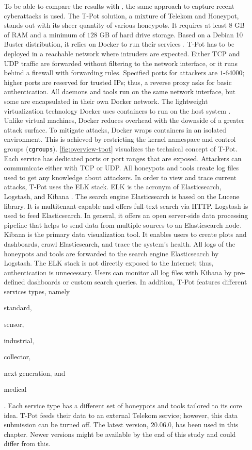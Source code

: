 To be able to compare the results with \citet{Kelly2021}, the same approach to capture recent cyberattacks is used.
The T-Pot solution, a mixture of Telekom and Honeypot, stands out with its sheer quantity of various honeypots.
It requires at least $8$ GB of RAM and a minimum of $128$ GB of hard drive storage.
Based on a Debian 10 Buster distribution, it relies on Docker to run their services \cite{docker2021}.
T-Pot has to be deployed in a reachable network where intruders are expected.
Either TCP and UDP traffic are forwarded without filtering to the network interface, or it runs behind a firewall with forwarding rules.
Specified ports for attackers are $1$-$64000$; higher ports are reserved for trusted IPs; thus, a reverse proxy asks for basic authentication.
All daemons and tools run on the same network interface, but some are encapsulated in their own Docker network.
The lightweight virtualization technology Docker uses containers to run on the host system \cite{combe2016}.
Unlike virtual machines, Docker reduces overhead with the downside of a greater attack surface.
To mitigate attacks, Docker wraps containers in an isolated environment.
This is achieved by restricting the kernel namespace and control groups (\verb|cgroups|).
\autoref{fig:overview-tpot} visualizes the technical concept of T-Pot.
Each service has dedicated ports or port ranges that are exposed.
Attackers can communicate either with TCP or UDP.
All honeypots and tools create log files used to get any knowledge about attackers.
In order to view and trace current attacks, T-Pot uses the ELK stack.
ELK is the acronym of Elasticsearch, Logstash, and Kibana \cite{elastic2021}.
The search engine Elasticsearch is based on the Lucene library.
It is multitenant-capable and offers full-text search via HTTP.
Logstash is used to feed Elasticsearch.
In general, it offers an open server-side data processing pipeline that helps to send data from multiple sources to an Elasticsearch node.
Kibana is the primary data visualization tool.
It enables users to create plots and dashboards, crawl Elasticsearch, and trace the system's health.
All logs of the honeypots and tools are forwarded to the search engine Elasticsearch by Logstash.
The ELK stack is not directly exposed to the Internet; thus, authentication is unnecessary.
Users can monitor all log files with Kibana by pre-defined dashboards or custom search queries.
In addition, T-Pot features different services types, namely
\begin{enumerate*}[label=(\roman*)]
    \item standard,
    \item sensor,
    \item industrial,
    \item collector,
    \item next generation, and
    \item medical
\end{enumerate*}.
Each service type has a different set of honeypots and tools tailored to its core idea.
T-Pot feeds their data to an external Telekom service; however, this data submission can be turned off.
The latest version, $20.06.0$, has been used in this chapter.
Newer versions might be available by the end of this study and could differ from this.

